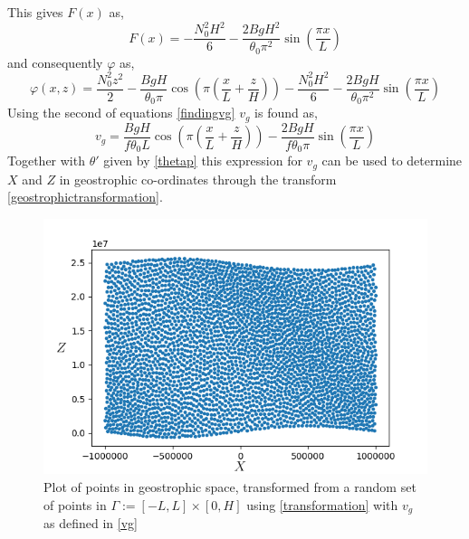 This gives $F(x)$ as,
\begin{equation*}
	F(x) = -\frac{N_0^2H^2}{6} - \frac{2BgH^2}{\theta_0\pi^2}\sin\left(\frac{\pi x}{L}\right)
\end{equation*}
and consequently $\varphi$ as,
\begin{equation}
	\varphi(x,z) = \frac{N_0^2z^2}{2} - \frac{BgH}{\theta_0\pi}\cos\left(\pi\left(\frac{x}{L}+\frac{z}{H}\right)\right)-\frac{N_0^2H^2}{6} - \frac{2BgH}{\theta_0\pi^2}\sin\left(\frac{\pi x}{L}\right)
\end{equation}
Using the second of equations \ref{findingvg} $v_g$ is found as,
\begin{equation}
	v_g = \frac{BgH}{f\theta_0L}\cos\left(\pi\left(\frac{x}{L}+\frac{z}{H}\right)\right)- \frac{2BgH}{f\theta_0\pi}\sin\left(\frac{\pi x}{L}\right)
	\label{vg}
\end{equation}
Together with $\theta'$ given by \ref{thetap} this expression for $v_g$ can be used to determine $X$ and $Z$ in geostrophic co-ordinates through the transform \ref{geostrophictransformation}.
\begin{figure}[h]
	\centering
	\includegraphics[width=0.7\linewidth]{project/gpoints}
	\caption[Plot of Points in Geostrophic Space]{Plot of points in geostrophic space, transformed from a random set of points in $\Gamma := [-L,L] \times [0,H]$ using \ref{transformation} with $v_g$ as defined in \ref{vg}}
	\label{fig:gpoints}
\end{figure}

